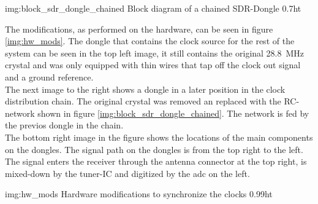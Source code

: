              {img:block_sdr_dongle_chained}
             {Block diagram of a chained SDR-Dongle}
             {0.7}{ht}

The modifications, as performed on the
hardware, can be seen in figure \ref{img:hw_mods}.
The dongle that contains the clock source for
the rest of the system can be seen in the top left
image, it still contains the original
\SI{28.8}{\mega\hertz} crystal and was only equipped
with thin wires that tap off the clock out signal
and a ground reference. \\

The next image to the right shows a dongle
in a later position in the clock distribution chain.
The original crystal was removed an replaced with
the RC-network shown in figure \ref{img:block_sdr_dongle_chained}.
The network is fed by the previos dongle in the chain. \\

The bottom right image in the figure shows the
locations of the main components on the dongles.
The signal path on the dongles is from the top right
to the left.
The signal enters the receiver through the antenna
connector at the top right, is mixed-down by the
tuner-IC and digitized by the \acrshort{adc} on the left.

             {img:hw_mods}
             {Hardware modifications to synchronize the clocks}
             {0.99}{ht}
